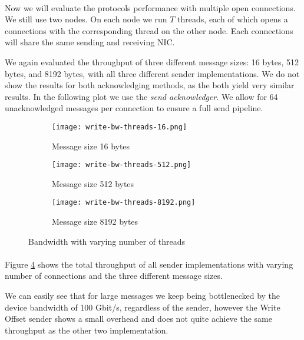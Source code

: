 \paragraph{} Now we will evaluate the protocols performance with multiple open connections. We still use two nodes.
On each node we run $T$ threads, each of which opens a connections with the corresponding thread on the other node.
Each connections will share the same sending and receiving NIC.

We again evaluated the throughput of three different message sizes: 16 bytes, 512 bytes, and 8192 bytes, with all 
three different sender implementations. We do not show the results for both acknowledging methods, as the both 
yield very similar results. In the following plot we use the \emph{send acknowledger}. We allow for 64 unacknowledged
messages per connection to ensure a full send pipeline.

\begin{figure}[]
  \centering
\begin{subfigure}[b]{0.49\textwidth}
  \centering
  \texttt{[image: write-bw-threads-16.png]}
  \caption{Message size 16 bytes}
  \label{fig:plot-write-bw-thread-16}
\end{subfigure}
\begin{subfigure}[b]{0.49\textwidth}
  \centering
  \texttt{[image: write-bw-threads-512.png]}
  \caption{Message size 512 bytes}
  \label{fig:plot-write-bw-thread-512}
\end{subfigure}
\begin{subfigure}[b]{0.49\textwidth}
  \centering
  \texttt{[image: write-bw-threads-8192.png]}
  \caption{Message size 8192 bytes}
  \label{fig:plot-write-bw-thread-8192}
\end{subfigure}
  \caption{Bandwidth with varying number of threads}
  \label{fig:plot-write-bw-thread}
\end{figure}

\paragraph{} Figure \ref{fig:plot-write-bw-thread} shows the total throughput of all sender implementations
with varying number of connections and the three different message sizes.

We can easily see that for large messages we keep being bottlenecked by the device bandwidth of 100 Gbit/s, regardless of 
the sender, however the Write Offset sender shows a small overhead and does not quite achieve the same throughput as the 
other two implementation. 

